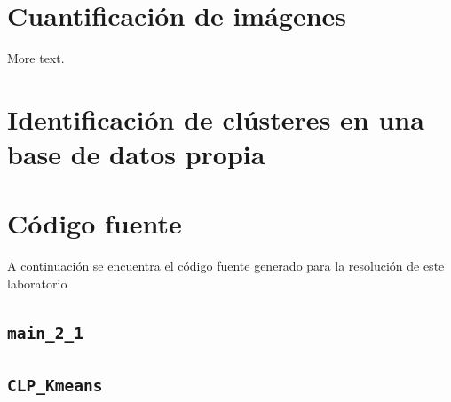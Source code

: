 \documentclass[11pt]{article} %
\begin{document}
\section{Cuantificación de imágenes}

More text.

\section{Identificación de clústeres en una base de datos propia}

\section{Código fuente}
\label{sec:src_code}

A continuación se encuentra el código fuente generado para la resolución de
este laboratorio

\subsection{\texttt{main\_2\_1}}
\label{src:main:21}




\subsection{\texttt{CLP\_Kmeans}}
\label{src:fun:kmeans}


\end{document}
